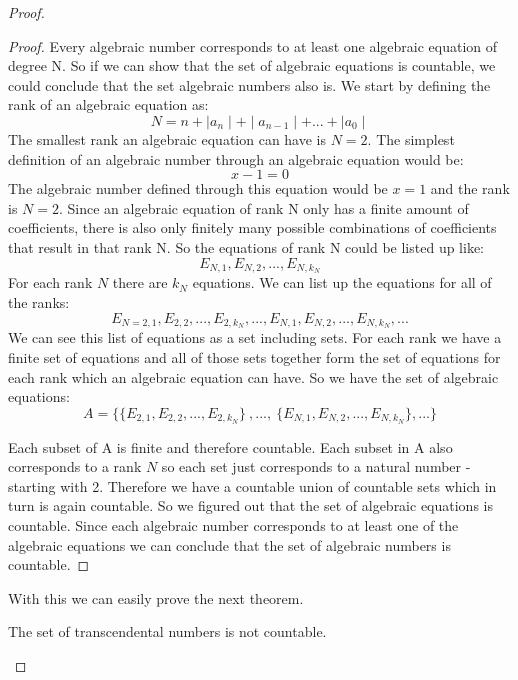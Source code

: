 \documentclass{article}
\theoremstyle{definition}
\begin{document}
\begin{proof}
\begin{proof}
Every algebraic number corresponds to at least one algebraic equation of degree N. So if we can show that the set of algebraic equations is countable, we could conclude that the set algebraic numbers also is. We start by defining the rank of an algebraic equation as:
\begin{equation}
    N = n + \mid a_n \mid + \mid a_{n-1} \mid + ... + \mid a_0 \mid 
\end{equation}
The smallest rank an algebraic equation can have is $N=2$. The simplest definition of an algebraic number through an algebraic equation would be:
\begin{equation}
    x-1=0
\end{equation}
The algebraic number defined through this equation would be $x=1$ and the rank is $N=2$. Since an algebraic equation of rank N only has a finite amount of coefficients, there is also only finitely many possible combinations of coefficients that result in that rank N.
So the equations of rank N could be listed up like:
\begin{equation}
    E_{N,1},  E_{N,2}, ... ,  E_{N,k_N}
\end{equation}
For each rank $N$ there are $k_N$ equations. We can list up the equations for all of the ranks:
\begin{equation}
    E_{N=2,1},  E_{2,2}, ... ,  E_{2,k_N}, ..., E_{N,1},  E_{N,2}, ... ,  E_{N,k_N} , ...
\end{equation}
We can see this list of equations as a set including sets. For each rank we have a finite set of equations and all of those sets together form the set of equations for each rank which an algebraic equation can have. So we have the set of algebraic equations:
\begin{equation}
 A  = \{ \{ E_{2,1},  E_{2,2}, ... ,  E_{2,k_N}\} \: , ...,\: \{ E_{N,1},  E_{N,2}, ... ,  E_{N,k_N}\} , ... \}
\end{equation}

Each subset of A is finite and therefore countable. Each subset in A also corresponds to a rank $N$ so each set just corresponds to a natural number - starting with 2. Therefore we have a countable union of countable sets which in turn is again countable. So we figured out that the set of algebraic equations is countable. Since each algebraic number corresponds to at least one of the algebraic equations we can conclude that the set of algebraic numbers is countable. 
\end{proof}
With this we can easily prove the next theorem.
\begin{theorem}
The set of transcendental numbers is not countable.
\end{theorem}


\end{proof}
\end{document}
